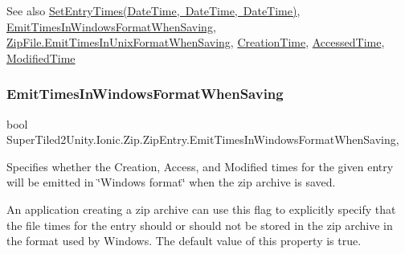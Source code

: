\begin{DoxySeeAlso}{See also}
\mbox{\hyperlink{class_super_tiled2_unity_1_1_ionic_1_1_zip_1_1_zip_entry_a7331ca69b05c476a9d321b30d7649766}{Set\+Entry\+Times(\+Date\+Time, Date\+Time, Date\+Time)}}, \mbox{\hyperlink{class_super_tiled2_unity_1_1_ionic_1_1_zip_1_1_zip_entry_affabc22ba72be27e9134676becddcec7}{Emit\+Times\+In\+Windows\+Format\+When\+Saving}}, \mbox{\hyperlink{class_super_tiled2_unity_1_1_ionic_1_1_zip_1_1_zip_file_af369a36c1bf83fc28466fe15c095ea87}{Zip\+File.\+Emit\+Times\+In\+Unix\+Format\+When\+Saving}}, \mbox{\hyperlink{class_super_tiled2_unity_1_1_ionic_1_1_zip_1_1_zip_entry_a38ef2ae810c3b89b1f23ebea918fb60e}{Creation\+Time}}, \mbox{\hyperlink{class_super_tiled2_unity_1_1_ionic_1_1_zip_1_1_zip_entry_abc1a038c251f1ed0e2c1435a5bab23fd}{Accessed\+Time}}, \mbox{\hyperlink{class_super_tiled2_unity_1_1_ionic_1_1_zip_1_1_zip_entry_a88021d72ea8b94c762388d92d74c2e0d}{Modified\+Time}}


\end{DoxySeeAlso}
\mbox{\label{class_super_tiled2_unity_1_1_ionic_1_1_zip_1_1_zip_entry_affabc22ba72be27e9134676becddcec7}} 
\subsubsection{\texorpdfstring{Emit\+Times\+In\+Windows\+Format\+When\+Saving}{EmitTimesInWindowsFormatWhenSaving}}
{\footnotesize\ttfamily bool Super\+Tiled2\+Unity.\+Ionic.\+Zip.\+Zip\+Entry.\+Emit\+Times\+In\+Windows\+Format\+When\+Saving\hspace{0.3cm}{\ttfamily [get]}, {\ttfamily [set]}}



Specifies whether the Creation, Access, and Modified times for the given entry will be emitted in \char`\"{}\+Windows format\char`\"{} when the zip archive is saved. 

An application creating a zip archive can use this flag to explicitly specify that the file times for the entry should or should not be stored in the zip archive in the format used by Windows. The default value of this property is {\ttfamily true}. 

